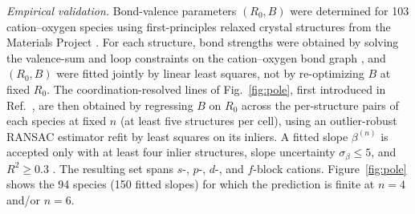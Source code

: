 \documentclass[aps,prmaterials,twocolumn,10pt,superscriptaddress,floatfix]{revtex4-2}
\newcommand{\runinsec}[1]{\medskip\emph{#1}}
\begin{document}
\runinsec{Empirical validation.} Bond-valence parameters $(R_0,B)$ were
determined for 103 cation--oxygen species using first-principles
relaxed crystal
structures from the Materials Project \cite{MaterialsProject,Horton2025}.
For each structure, bond strengths were obtained by solving the
valence-sum and loop constraints on the cation--oxygen bond graph
\cite{Li2025}, and $(R_0,B)$ were fitted jointly by linear least
squares, not by re-optimizing $B$ at fixed $R_0$.
The coordination-resolved
lines of Fig.~\ref{fig:pole}, first introduced in
Ref.~\cite{Li2025}, are then obtained by regressing $B$ on
$R_0$ across the per-structure pairs of each species at fixed $n$ (at
least five structures per cell), using an outlier-robust RANSAC
estimator refit by least squares on its inliers.  A fitted slope
$\beta^{(n)}$ is accepted only with at least four inlier structures,
slope uncertainty $\sigma_\beta\le 5$, and $R^2\ge 0.3$
\cite{suppmat,YukawaScreeningRepo}.  The resulting set spans $s$-,
$p$-, $d$-, and $f$-block cations.  Figure~\ref{fig:pole} shows the 94
species (150 fitted slopes) for which the prediction is finite at
$n=4$ and/or $n=6$.
\end{document}
